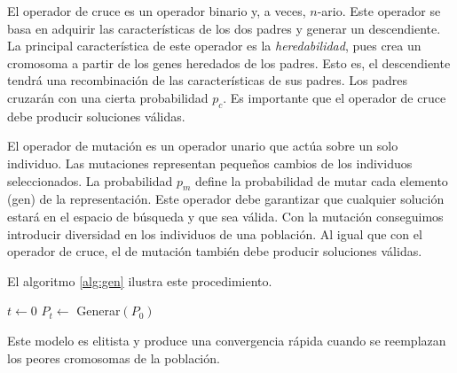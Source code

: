 El operador de cruce es un operador binario y, a veces, $n$-ario. Este operador se basa en adquirir las características de los dos padres y generar un descendiente. La principal característica de este operador es la \emph{heredabilidad}, pues crea un cromosoma a partir de los genes heredados de los padres. Esto es, el descendiente tendrá una recombinación de las características de sus padres. Los padres cruzarán con una cierta probabilidad $p_c$. Es importante que el operador de cruce debe producir soluciones válidas.

El operador de mutación es un operador unario que actúa sobre un solo individuo. Las mutaciones representan pequeños cambios de los individuos seleccionados. La probabilidad $p_m$ define la probabilidad de mutar cada elemento (gen) de la representación. Este operador debe garantizar que cualquier solución estará en el espacio de búsqueda y que sea válida. Con la mutación conseguimos introducir diversidad en los individuos de una población. Al igual que con el operador de cruce, el de mutación también debe producir soluciones válidas.

El algoritmo \ref{alg:gen} ilustra este procedimiento.

\begin{Ualgorithm}[H]
    \label{alg:gen}
    \small
    \DontPrintSemicolon
    $t \longleftarrow 0$\;
    $P_t \longleftarrow$ Generar$(P_0)$ 

\end{Ualgorithm}

Este modelo es elitista y produce una convergencia rápida cuando se reemplazan los peores cromosomas de la población.

